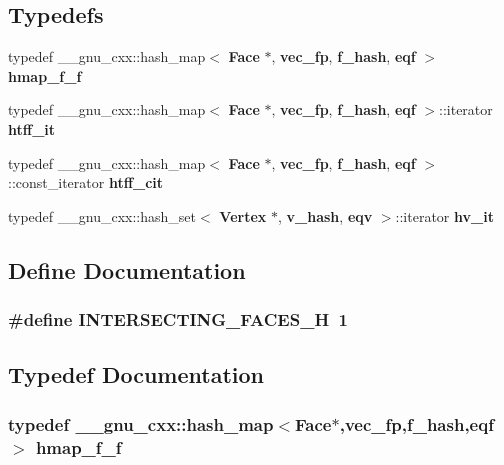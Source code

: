 \subsection*{Typedefs}
\begin{CompactItemize}
\item 
typedef \_\-\_\-gnu\_\-cxx::hash\_\-map$<$ {\bf Face} $\ast$, {\bf vec\_\-fp}, {\bf f\_\-hash}, {\bf eqf} $>$ {\bf hmap\_\-f\_\-f}
\item 
typedef \_\-\_\-gnu\_\-cxx::hash\_\-map$<$ {\bf Face} $\ast$, {\bf vec\_\-fp}, {\bf f\_\-hash}, {\bf eqf} $>$::iterator {\bf htff\_\-it}
\item 
typedef \_\-\_\-gnu\_\-cxx::hash\_\-map$<$ {\bf Face} $\ast$, {\bf vec\_\-fp}, {\bf f\_\-hash}, {\bf eqf} $>$::const\_\-iterator {\bf htff\_\-cit}
\item 
typedef \_\-\_\-gnu\_\-cxx::hash\_\-set$<$ {\bf Vertex} $\ast$, {\bf v\_\-hash}, {\bf eqv} $>$::iterator {\bf hv\_\-it}
\end{CompactItemize}


\subsection{Define Documentation}
\subsubsection{\setlength{\rightskip}{0pt plus 5cm}\#define INTERSECTING\_\-FACES\_\-H~1}\label{intersecting__faces_8h_0e45448521cb2f7849d48919b168335e}




\subsection{Typedef Documentation}
\subsubsection{\setlength{\rightskip}{0pt plus 5cm}typedef \_\-\_\-gnu\_\-cxx::hash\_\-map$<${\bf Face}$\ast$,{\bf vec\_\-fp},{\bf f\_\-hash},{\bf eqf}$>$ {\bf hmap\_\-f\_\-f}}\label{intersecting__faces_8h_e32beed597499e15d50c912443dbbb8e}


